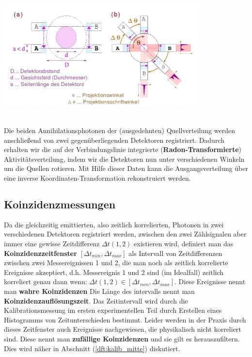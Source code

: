 	\minipanf
		\begin{center}
			\includegraphics[width=0.8\textwidth, height=0.3\textheight]{pic/PET-Prinzip.png}
			\label{PET-Prinzip}
		\end{center}
	\minipend 
	\hspace{3mm}
	\ \\	
	Die beiden Annihilationsphotonen der (ausgedehnten) Quellverteilung werden anschließend von zwei gegenüberliegenden Detektoren registriert. Dadurch erhalten wir die auf der Verbindungslinie integrierte (\textbf{Radon-Transformierte}) Aktivitätsverteilung, indem wir die Detektoren nun unter verschiedenen Winkeln um die Quellen rotieren. Mit Hilfe dieser Daten kann die Ausgangsverteilung über eine inverse Koordinaten-Transformation rekonstruiert werden.\cite{PA}	
	
\subsection{Koinzidenzmessungen}
	Da die gleichzeitig emittierten, also zeitlich korrelierten, Photonen in zwei verschiedenen Detektoren registriert werden, zwischen den zwei Zählsignalen aber immer eine gewisse Zeitdifferenz $\Delta t(1,2)$ existieren wird, definiert man das \textbf{Koinzidenzzeitfenster} $[\Delta t_{min}, \Delta t_{max}]$ als Intervall von Zeitdifferenzen zwischen zwei Messereignissen 1 und 2, die man noch als zeitlich korrelierte Ereignisse akzeptiert, d.h. Messereignis 1 und 2 sind (im Idealfall) zeitlich korreliert genau dann wenn: $\Delta t(1,2) \in [\Delta t_{min}, \Delta t_{max}]$. Diese Ereignisse nennt man \textbf{wahre Koinzidenzen} Die Länge des intervalls nennt man \textbf{Koinzidenzauflösungszeit}. Das Zeitintervall wird durch die Kalibrationsmessung im ersten experimentellen Teil durch Erstellen eines Histogramms von Zeitunterschieden bestimmt. Leider werden in der Praxis durch dieses Zeitfenster auch Ereignisse nachgewiesen, die physikalisch nicht korreliert sind. Diese nennt man \textbf{zufällige Koinzidenzen} und sie gilt es herauszufiltern.\cite{PA} Dies wird näher in Abschnitt (\ref{dft:kalib_mitte}) diskutiert.


